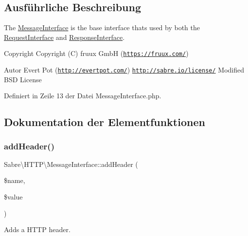 \subsection{Ausführliche Beschreibung}
The \mbox{\hyperlink{interface_sabre_1_1_h_t_t_p_1_1_message_interface}{Message\+Interface}} is the base interface that\textquotesingle{}s used by both the \mbox{\hyperlink{interface_sabre_1_1_h_t_t_p_1_1_request_interface}{Request\+Interface}} and \mbox{\hyperlink{interface_sabre_1_1_h_t_t_p_1_1_response_interface}{Response\+Interface}}.

\begin{DoxyCopyright}{Copyright}
Copyright (C) fruux GmbH (\href{https://fruux.com/}{\tt https\+://fruux.\+com/}) 
\end{DoxyCopyright}
\begin{DoxyAuthor}{Autor}
Evert Pot (\href{http://evertpot.com/}{\tt http\+://evertpot.\+com/})  \href{http://sabre.io/license/}{\tt http\+://sabre.\+io/license/} Modified B\+SD License 
\end{DoxyAuthor}


Definiert in Zeile 13 der Datei Message\+Interface.\+php.



\subsection{Dokumentation der Elementfunktionen}
\mbox{\label{interface_sabre_1_1_h_t_t_p_1_1_message_interface_ab64fcf12f65ca467a36b0f00961dd06b}} 
\subsubsection{\texorpdfstring{add\+Header()}{addHeader()}}
{\footnotesize\ttfamily Sabre\textbackslash{}\+H\+T\+T\+P\textbackslash{}\+Message\+Interface\+::add\+Header (\begin{DoxyParamCaption}\item[{}]{\$name,  }\item[{}]{\$value }\end{DoxyParamCaption})}

Adds a H\+T\+TP header.

